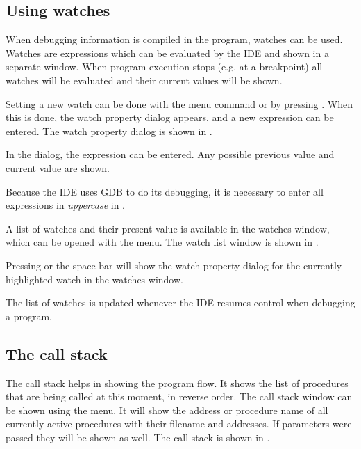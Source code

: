 %
%
\subsection{Using watches}
When debugging information is compiled in the program, watches can be used.
Watches are expressions which can be evaluated by the IDE and shown in a
separate window. When program execution stops (e.g. at a breakpoint) all
watches will be evaluated and their current values will be shown.

Setting a new watch can be done with the  menu
command or by pressing . When this is done, the watch
property dialog appears, and a new expression can be entered.
The watch property dialog is shown in .


In the dialog, the expression can be entered. Any possible previous value
and current value are shown.
\begin{remark}
Because the IDE uses GDB to do its debugging, it is necessary to enter all
expressions in {\em uppercase} in \freebsd.
\end{remark}
A list of watches and their present value is available in the watches
window, which can be opened with the  menu.
The watch list window is shown in .


Pressing  or the space bar will show the watch property dialog
for the currently highlighted watch in the watches window.

The list of watches is updated whenever the IDE resumes control when
debugging a program.
%
%
\subsection{The call stack}
\label{se:callstack}
The call stack helps in showing the program flow. It shows the list of
procedures that are being called at this moment, in reverse order.
The call stack window can be shown using the  menu.
It will show the address or procedure name of all currently active
procedures with their filename and addresses. If parameters were passed
they will be shown as well. The call stack is shown in .


